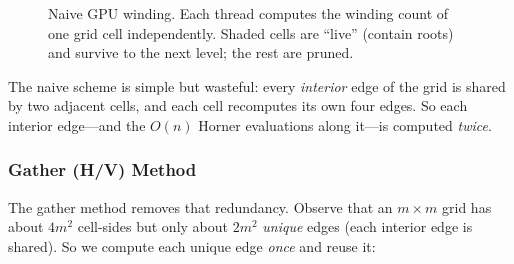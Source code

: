 \documentclass[11pt]{article}
\begin{document}
\begin{figure}[h]
\centering
{}
\caption{Naive GPU winding. Each thread computes the winding count of one grid
cell independently. Shaded cells are ``live'' (contain roots) and survive to the
next level; the rest are pruned.}
\label{fig:naive}
\end{figure}

The naive scheme is simple but wasteful: every \emph{interior} edge of the grid
is shared by two adjacent cells, and each cell recomputes its own four edges. So
each interior edge---and the $O(n)$ Horner evaluations along it---is computed
\emph{twice}.

\subsubsection{Gather (H/V) Method}
The gather method removes that redundancy. Observe that an $m\times m$ grid has
about $4m^2$ cell-sides but only about $2m^2$ \emph{unique} edges (each interior
edge is shared). So we compute each unique edge \emph{once} and reuse it:
\end{document}
